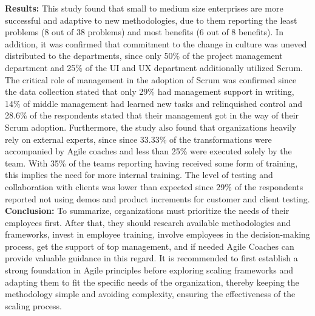 \textbf{Results: }This study found that small to medium size enterprises are more successful and adaptive to new methodologies, due to them reporting the least problems (8 out of 38 problems) and most benefits (6 out of 8 benefits). In addition, it was confirmed that commitment to the change in culture was uneved distributed to the departments, since only 50\% of the project management department and 25\% of the UI and UX department additionally utilized Scrum. The critical role of management in the adoption of Scrum was confirmed since the data collection stated that only 29\% had management support in writing, 14\% of middle management had learned new tasks and relinquished control and 28.6\% of the respondents stated that their management got in the way of their Scrum adoption. Furthermore, the study also found that organizations heavily rely on external experts, since since 33.33\% of the transformations were accompanied by Agile coaches and less than 25\% were executed solely by the team.
With 35\% of the teams reporting having received some form of training, this implies the need for more internal training. The level of testing and collaboration with clients was lower than expected since 29\% of the respondents reported not using demos and product increments for customer and client testing.\newline
\textbf{Conclusion: }To summarize, organizations must prioritize the needs of their employees first. After that, they should research available methodologies and frameworks, invest in employee training, involve employees in the decision-making process, get the support of top management, and if needed Agile Coaches can provide valuable guidance in this regard. It is recommended to first establish a strong foundation in Agile principles before exploring scaling frameworks and adapting them to fit the specific needs of the organization, thereby keeping the methodology simple and avoiding complexity, ensuring the effectiveness of the scaling process.